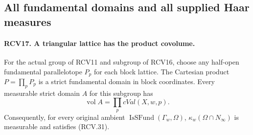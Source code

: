 \documentclass[11pt,a4paper]{article}
\numberwithin{equation}{section}
\theoremstyle{remark}\newtheorem{remark}[theorem]{Remark}
\begin{document}
\subsection{All fundamental domains and all supplied Haar measures}

\paragraph{RCV17. A triangular lattice has the product covolume.}
\label{claim:RCV17}
For the actual group of RCV11 and subgroup of RCV16, choose any
half-open fundamental parallelotope \(P_p\) for each block lattice.
The Cartesian product \(P=\prod_p P_p\) is a strict fundamental
domain in block coordinates.  Every measurable strict domain
\(A\) for this subgroup has
\[
                     \operatorname{vol}A=\prod_p cVal(X,w,p).
\tag{RCV.31}
\]
Consequently, for every original ambient
\(\operatorname{IsSFund}(\Gamma_w,\Omega)\),
\(\kappa_w(\Omega\cap N_\infty)\) is measurable and satisfies
(RCV.31).
\end{document}

